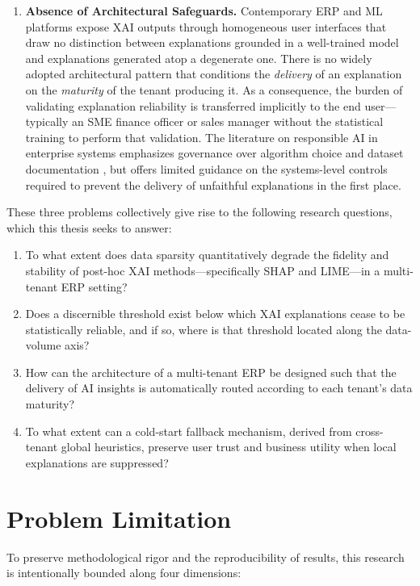 \begin{enumerate}[label=\arabic*.]
  \item \textbf{Absence of Architectural Safeguards.}
  Contemporary ERP and ML platforms expose XAI outputs through homogeneous user interfaces that draw no distinction between explanations grounded in a well-trained model and explanations generated atop a degenerate one. There is no widely adopted architectural pattern that conditions the \emph{delivery} of an explanation on the \emph{maturity} of the tenant producing it. As a consequence, the burden of validating explanation reliability is transferred implicitly to the end user---typically an SME finance officer or sales manager without the statistical training to perform that validation. The literature on responsible AI in enterprise systems emphasizes governance over algorithm choice and dataset documentation \citep{mitchell2019model, gebru2021datasheets}, but offers limited guidance on the systems-level controls required to prevent the delivery of unfaithful explanations in the first place.
\end{enumerate}

\noindent
These three problems collectively give rise to the following research questions, which this thesis seeks to answer:

\begin{enumerate}[label=\textbf{RQ\arabic*:}]
  \item To what extent does data sparsity quantitatively degrade the fidelity and stability of post-hoc XAI methods---specifically SHAP and LIME---in a multi-tenant ERP setting?
  \item Does a discernible threshold exist below which XAI explanations cease to be statistically reliable, and if so, where is that threshold located along the data-volume axis?
  \item How can the architecture of a multi-tenant ERP be designed such that the delivery of AI insights is automatically routed according to each tenant's data maturity?
  \item To what extent can a cold-start fallback mechanism, derived from cross-tenant global heuristics, preserve user trust and business utility when local explanations are suppressed?
\end{enumerate}

\section{Problem Limitation}
\label{sec:problem_limitation}

To preserve methodological rigor and the reproducibility of results, this research is intentionally bounded along four dimensions:

